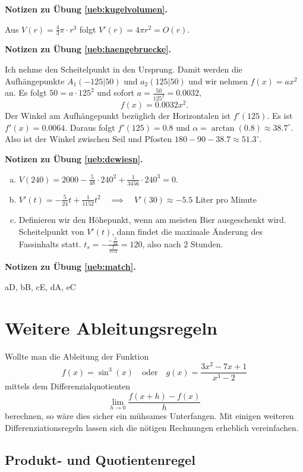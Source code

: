 \documentclass[%
11pt,%
twoside,%
titlepage,%
german,%
headsepline%
]{scrartcl}
\theoremstyle{definition}
\theoremstyle{plain}
\newcommand{\concatueb}[1]{ueb:#1}%
\newcommand{\concatlsg}[1]{lsg:#1}%
\newenvironment{lsg}[1]{%
    \par\noindent\textbf{Notizen zu Übung \ref{\concatueb{#1}}.}%
    \label{\concatlsg{#1}}
}{%
    \par%
}
\begin{document}
\begin{lsg}{kugelvolumen}
    Aus $V(r)=\frac{4}{3}\pi\cdot r^3$ folgt $V'(r)=4\pi r^2=O(r)$.
\end{lsg}
\begin{lsg}{haengebruecke}
    Ich nehme den Scheitelpunkt in den Ursprung. Damit werden die Aufhängepunkte $A_1(-125|50)$ und $a_2(125|50)$ und wir nehmen $f(x)=ax^2$ an. Es folgt $50=a\cdot125^2$ und sofort $a=\frac{50}{125^2}=0.0032$,
    $$f(x)=0.0032x^2.$$
    Der Winkel am Aufhängepunkt bezüglich der Horizontalen ist $f'(125)$. Es ist $f'(x)=0.0064$. Daraus folgt $f'(125)=0.8$ und $\alpha=\arctan(0.8)\approx38.7^\circ$. Also ist der Winkel zwischen Seil und Pfosten $180-90-38.7\approx51.3^\circ$.
\end{lsg}
\begin{lsg}{dewiesn}
    \begin{enumerate}[a)]
        \item $V(240)=2000-\frac{5}{48}\cdot240^2+\frac{1}{3456}\cdot240^3=0$.
        \item $V'(t)=-\frac{5}{24}t+\frac{1}{1152}t^2\quad\implies\quad V'(30)\approx-5.5$ Liter pro Minute
        \item Definieren wir den Höhepunkt, wenn am meisten Bier ausgeschenkt wird. Scheitelpunkt von $V'(t)$, dann findet die maximale Änderung des Fassinhalts statt. $t_s=-\frac{-\frac{5}{24}}{\frac{2}{1152}}=120$, also nach 2 Stunden.
    \end{enumerate}
\end{lsg}
\begin{lsg}{match}
    aD, bB, cE, dA, eC
\end{lsg}

\clearpage

\section{Weitere Ableitungsregeln}

Wollte man die Ableitung der Funktion
$$f(x)=\sin^3(x)\quad\text{oder}\quad g(x)=\frac{3x^2-7x+1}{x^3-2}$$
mittels dem Differenzialquotienten
$$\lim_{h\to0}\frac{f(x+h)-f(x)}{h}$$
berechnen, so wäre dies sicher ein mühsames Unterfangen. Mit einigen weiteren Differenziationsregeln lassen sich die nötigen Rechnungen erheblich vereinfachen.

\subsection{Produkt- und Quotientenregel}
\end{document}
